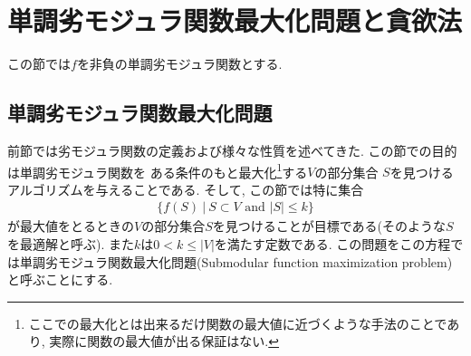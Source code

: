 \documentclass[11pt, a4paper, dvipdfmx]{jsarticle}
\theoremstyle{definition}
\begin{document}
\section{単調劣モジュラ関数最大化問題と貪欲法}
この節では$f$を非負の単調劣モジュラ関数とする.
\subsection{単調劣モジュラ関数最大化問題}
 前節では劣モジュラ関数の定義および様々な性質を述べてきた. この節での目的は単調劣モジュラ関数を
 ある条件のもと最大化\footnote{ここでの最大化とは出来るだけ関数の最大値に近づくような手法のことであり, 実際に関数の最大値が出る保証はない.}する$V$の部分集合
 $S$を見つけるアルゴリズムを与えることである.
 そして, この節では特に集合
 \begin{align*}
    \{ f(S)~|~S\subset V\text{ and }|S| \leq k\}
 \end{align*} 
 が最大値をとるときの$V$の部分集合$S$を見つけることが目標である(そのような$S$を最適解と呼ぶ). また$k$は$0<k\leq |V|$を満たす定数である. 
 この問題をこの方程では単調劣モジュラ関数最大化問題(Submodular function maximization problem)と呼ぶことにする. 
\end{document}
